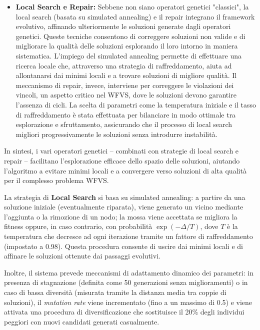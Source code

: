 \documentclass[12pt,a4paper,twoside]{article}
\begin{document}
\begin{itemize}
\item \textbf{Local Search e Repair:} Sebbene non siano operatori genetici "classici", la local search (basata su simulated annealing) e il repair integrano il framework evolutivo, affinando ulteriormente le soluzioni generate dagli operatori genetici. Queste tecniche consentono di correggere soluzioni non valide e di migliorare la qualità delle soluzioni esplorando il loro intorno in maniera sistematica.  
L'impiego del simulated annealing permette di effettuare una ricerca locale che, attraverso una strategia di raffreddamento, aiuta ad allontanarsi dai minimi locali e a trovare soluzioni di migliore qualità. Il meccanismo di repair, invece, interviene per correggere le violazioni dei vincoli, un aspetto critico nel WFVS, dove le soluzioni devono garantire l'assenza di cicli. La scelta di parametri come la temperatura iniziale e il tasso di raffreddamento è stata effettuata per bilanciare in modo ottimale tra esplorazione e sfruttamento, assicurando che il processo di local search migliori progressivamente le soluzioni senza introdurre instabilità.

\end{itemize}

In sintesi, i vari operatori genetici – combinati con strategie di local search e repair – facilitano l'esplorazione efficace dello spazio delle soluzioni, aiutando l'algoritmo a evitare minimi locali e a convergere verso soluzioni di alta qualità per il complesso problema WFVS.


La strategia di \textbf{Local Search} si basa su simulated annealing: a partire da una soluzione iniziale (eventualmente riparata), viene generato un vicino mediante l'aggiunta o la rimozione di un nodo; la mossa viene accettata se migliora la fitness oppure, in caso contrario, con probabilità \(\exp(-\Delta/T)\), dove \(T\) è la temperatura che decresce ad ogni iterazione tramite un fattore di raffreddamento (impostato a 0.98). Questa procedura consente di uscire dai minimi locali e di affinare le soluzioni ottenute dai passaggi evolutivi.

Inoltre, il sistema prevede meccanismi di adattamento dinamico dei parametri: in presenza di stagnazione (definita come 50 generazioni senza miglioramenti) o in caso di bassa diversità (misurata tramite la distanza media tra coppie di soluzioni), il \emph{mutation rate} viene incrementato (fino a un massimo di 0.5) e viene attivata una procedura di diversificazione che sostituisce il 20\% degli individui peggiori con nuovi candidati generati casualmente.
\end{document}
